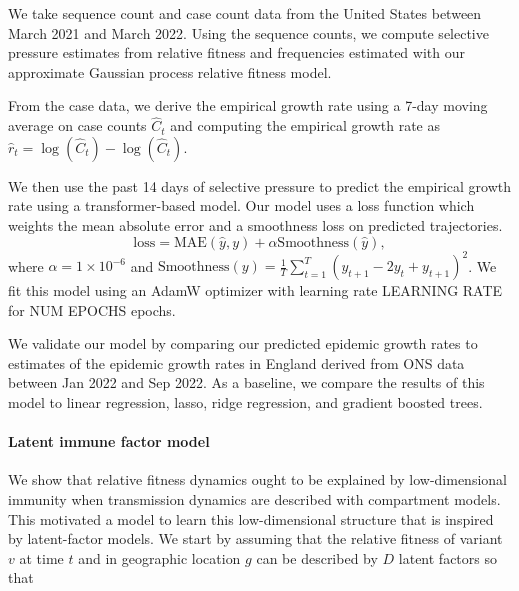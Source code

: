 \documentclass[12pt,oneside,letterpaper]{article}
\begin{document}
We take sequence count and case count data from the United States between March 2021 and March 2022.
Using the sequence counts, we compute selective pressure estimates from relative fitness and frequencies estimated with our approximate Gaussian process relative fitness model. 

From the case data, we derive the empirical growth rate using a 7-day moving average on case counts $\hat{C}_{t}$ and computing the empirical growth rate as $\hat{r}_{t} = \log(\hat{C}_{t}) - \log(\hat{C}_{t})$.

We then use the past 14 days of selective pressure to predict the empirical growth rate using a transformer-based model.
Our model uses a loss function which weights the mean absolute error and a smoothness loss on predicted trajectories.
\begin{equation*}
    \text{loss} = \text{MAE}(\hat{y}, y) + \alpha \text{Smoothness}(\hat{y}),
\end{equation*}
where $\alpha = 1\times 10^{-6}$ and $\text{Smoothness}(y) = \frac{1}{T}\sum_{t=1}^{T} (y_{t+1} - 2 y_{t} + y_{t+1})^{2}$.
We fit this model using an AdamW optimizer with learning rate LEARNING RATE for NUM EPOCHS epochs.

We validate our model by comparing our predicted epidemic growth rates to estimates of the epidemic growth rates in England derived from ONS data between Jan 2022 and Sep 2022.
As a baseline, we compare the results of this model to linear regression, lasso, ridge regression, and gradient boosted trees.



\paragraph{Latent immune factor model}%

We show that relative fitness dynamics ought to be explained by low-dimensional immunity when transmission dynamics are described with compartment models.
This motivated a model to learn this low-dimensional structure that is inspired by latent-factor models. 
We start by assuming that the relative fitness of variant $v$ at time $t$ and in geographic location $g$ can be described by $D$ latent factors so that
\end{document}

